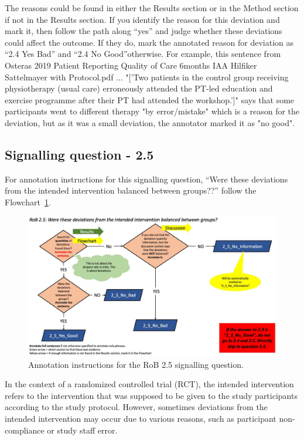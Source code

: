 \documentclass[sn-mathphys,Numbered]{sn-jnl}%
\begin{document}
The reasons could be found in either the Results section or in the Method section if not in the Results section.
If you identify the reason for this deviation and mark it, then follow the path along ``yes'' and judge whether these deviations could affect the outcome.
If they do, mark the annotated reason for deviation as ``2.4 Yes Bad'' and ``2.4 No Good''otherwise.
For example, this sentence from Osteras 2019 Patient Reporting Quality of Care 6months IAA Hilfiker Sattelmayer with Protocol.pdf ... "['Two patients in the control group receiving physiotherapy (usual care) erroneously attended the PT-led education and exercise programme after their PT had attended the workshop.']" says that some participants went to different therapy "by error/mistake" which is a reason for the deviation, but as it was a small deviation, the annotator marked it as "no good".
%
%
%
\subsection*{Signalling question - 2.5 }
%
For annotation instructions for this signalling question, ``Were these deviations from the intended intervention balanced between groups??'' follow the Flowchart~\ref{fig:2_5}.
%
\begin{figure}[hbt]
    \centering
    \includegraphics[width=\textwidth]{figures/2_5.jpg}
    \caption{Annotation instructions for the RoB 2.5 signalling question.}
    \label{fig:2_5}
\end{figure}
%
In the context of a randomized controlled trial (RCT), the intended intervention refers to the intervention that was supposed to be given to the study participants according to the study protocol. However, sometimes deviations from the intended intervention may occur due to various reasons, such as participant non-compliance or study staff error.
\end{document}

